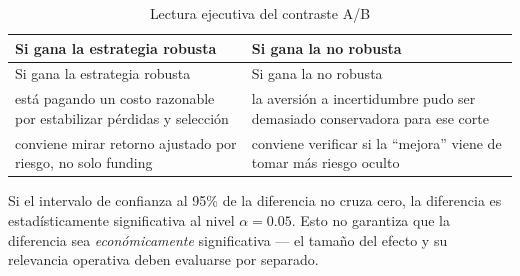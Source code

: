\documentclass[
  spanish,
  11pt,
  letterpaper,
]{scrbook}
\theoremstyle{plain}
\theoremstyle{remark}
\begin{document}
\begin{longtable}[]{@{}
  >{\raggedright\arraybackslash}p{}
  >{\raggedright\arraybackslash}p{}@{}}
\caption{Lectura ejecutiva del contraste
A/B}\label{tbl-ab-business-reading}\tabularnewline
\toprule\noalign{}
\begin{minipage}[b]{\linewidth}\raggedright
Si gana la estrategia robusta
\end{minipage} & \begin{minipage}[b]{\linewidth}\raggedright
Si gana la no robusta
\end{minipage} \\
\midrule\noalign{}
\endfirsthead
\toprule\noalign{}
\begin{minipage}[b]{\linewidth}\raggedright
Si gana la estrategia robusta
\end{minipage} & \begin{minipage}[b]{\linewidth}\raggedright
Si gana la no robusta
\end{minipage} \\
\midrule\noalign{}
\endhead
\bottomrule\noalign{}
\endlastfoot
está pagando un costo razonable por estabilizar pérdidas y selección &
la aversión a incertidumbre pudo ser demasiado conservadora para ese
corte \\
conviene mirar retorno ajustado por riesgo, no solo funding & conviene
verificar si la ``mejora'' viene de tomar más riesgo oculto \\
\end{longtable}

\begin{tcolorbox}[enhanced jigsaw, arc=.35mm, bottomrule=.15mm, bottomtitle=1mm, breakable, colback=white, colbacktitle=quarto-callout-note-color!10!white, colframe=quarto-callout-note-color-frame, coltitle=black, left=2mm, leftrule=.75mm, opacityback=0, opacitybacktitle=0.6, rightrule=.15mm, title=\textcolor{quarto-callout-note-color}{\faInfo}\hspace{0.5em}{Significancia estadística e intervalo de confianza}, titlerule=0mm, toprule=.15mm, toptitle=1mm]

Si el intervalo de confianza al 95\% de la diferencia no cruza cero, la
diferencia es estadísticamente significativa al nivel \(\alpha = 0.05\).
Esto no garantiza que la diferencia sea \emph{económicamente}
significativa --- el tamaño del efecto y su relevancia operativa deben
evaluarse por separado.

\end{tcolorbox}
\end{document}
